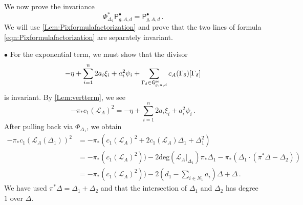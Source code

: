 \documentclass[a4paper,12pt]{article} %
\def\P{\mathsf{P}}
\def\qed{{\hfill $\Diamond$}}
\def\G{\mathsf{G}}
\theoremstyle{definition}
\theoremstyle{plain}%
\newcommand{\jocomment}[1]{}
\begin{document}




We now prove the invariance 
\[\Phi_{\Delta_1}^* \P_{g,A,d}^\bullet = \P_{g,A,d}^\bullet\, .\]
We will use \cref{Lem:Pixformulafactorization} and prove that the two lines of formula \eqref{eqn:Pixformulafactorization} are separately
invariant.

\noindent $\bullet$ For the exponential term, we must show that the divisor
\[-\eta + \sum_{i=1}^n 2 a_i \xi_i+ a_i^2 \psi_i  + \sum_{\Gamma_\delta \in \G_{g,n,d}^\textup{se}} c_A(\Gamma_\delta) [\Gamma_\delta]\]
is invariant. By \cref{Lem:vertterm}, we see  
\[- \pi_* c_1(\mathcal{L}_A)^2 =
-\eta + \sum_{i=1}^n 2 a_i \xi_i+ a_i^2 \psi_i \, .\]
After pulling back via $\Phi_{\Delta_1}$, we obtain
\begin{align*}
- \pi_* c_1(\mathcal{L}_A(\Delta_1))^2 &= - \pi_* \left( c_1(\mathcal{L}_A)^2 + 2 c_1(\mathcal{L}_A) \Delta_1 + \Delta_1^2\right)\\
&= - \pi_* \left( c_1(\mathcal{L}_A)^2\right)) -2 \mathrm{deg}\left(\mathcal{L}_A|_{\Delta_1}\right) \pi_* \Delta_1 - \pi_* \left( \Delta_1 \cdot (\pi^* \Delta - \Delta_2)\right)\\
&= - \pi_* \left( c_1(\mathcal{L}_A)^2\right)) -2 \left(d_1 - \sum_{i \in N_1} a_i\right) \Delta + \Delta\, .
\end{align*}
We have used $\pi^* \Delta = \Delta_1 + \Delta_2$
and that the intersection of $\Delta_1$ and $\Delta_2$ has degree $1$ over $\Delta$. 

\end{document}
